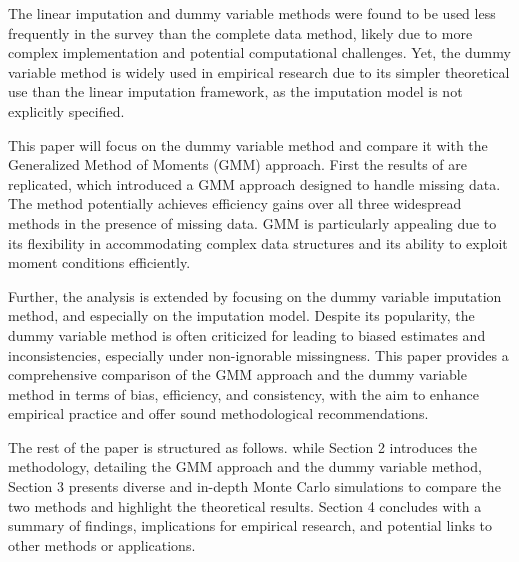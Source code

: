 The linear imputation and dummy variable methods were found to be used less frequently in the survey than the complete data method, likely due to more complex implementation and potential computational challenges.
Yet, the dummy variable method is widely used in empirical research due to its simpler theoretical use than the linear imputation framework, as the imputation model is not explicitly specified.

This paper will focus on the dummy variable method and compare it with the Generalized Method of Moments (GMM) approach. First the results of \citet{abrevaya2017} are replicated, which introduced a GMM approach designed to handle missing data. The method potentially achieves efficiency gains over all three widespread methods in the presence of missing data.
GMM is particularly appealing due to its flexibility in accommodating complex data structures and its ability to exploit moment conditions efficiently.

Further, the analysis is extended by focusing on the dummy variable imputation method, and especially on the imputation model.
Despite its popularity, the dummy variable method is often criticized for leading to biased estimates and inconsistencies, especially under non-ignorable missingness.
This paper provides a comprehensive comparison of the GMM approach and the dummy variable method in terms of bias, efficiency, and consistency, with the aim to enhance empirical practice and offer sound methodological recommendations.

The rest of the paper is structured as follows.
while Section 2 introduces the methodology, detailing the GMM approach and the dummy variable method, Section 3 presents diverse and in-depth Monte Carlo simulations to compare the two methods and highlight the theoretical results.
Section 4 concludes with a summary of findings, implications for empirical research, and potential links to other methods or applications.
